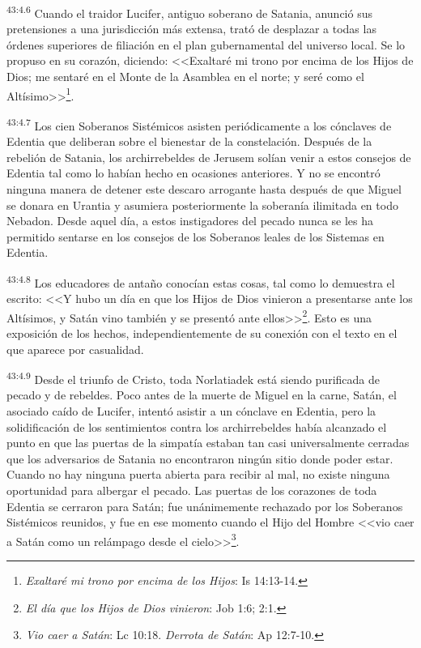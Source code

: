 \par
\textsuperscript{43:4.6} Cuando el traidor Lucifer, antiguo soberano de Satania, anunció sus pretensiones a una jurisdicción más extensa, trató de desplazar a todas las órdenes superiores de filiación en el plan gubernamental del universo local. Se lo propuso en su corazón, diciendo: <<Exaltaré mi trono por encima de los Hijos de Dios; me sentaré en el Monte de la Asamblea en el norte; y seré como el Altísimo>>\footnote{\textit{Exaltaré mi trono por encima de los Hijos}: Is 14:13-14.}.

\par
\textsuperscript{43:4.7} Los cien Soberanos Sistémicos asisten periódicamente a los cónclaves de Edentia que deliberan sobre el bienestar de la constelación. Después de la rebelión de Satania, los archirrebeldes de Jerusem solían venir a estos consejos de Edentia tal como lo habían hecho en ocasiones anteriores. Y no se encontró ninguna manera de detener este descaro arrogante hasta después de que Miguel se donara en Urantia y asumiera posteriormente la soberanía ilimitada en todo Nebadon. Desde aquel día, a estos instigadores del pecado nunca se les ha permitido sentarse en los consejos de los Soberanos leales de los Sistemas en Edentia.

\par
\textsuperscript{43:4.8} Los educadores de antaño conocían estas cosas, tal como lo demuestra el escrito: <<Y hubo un día en que los Hijos de Dios vinieron a presentarse ante los Altísimos, y Satán vino también y se presentó ante ellos>>\footnote{\textit{El día que los Hijos de Dios vinieron}: Job 1:6; 2:1.}. Esto es una exposición de los hechos, independientemente de su conexión con el texto en el que aparece por casualidad.

\par
\textsuperscript{43:4.9} Desde el triunfo de Cristo, toda Norlatiadek está siendo purificada de pecado y de rebeldes. Poco antes de la muerte de Miguel en la carne, Satán, el asociado caído de Lucifer, intentó asistir a un cónclave en Edentia, pero la solidificación de los sentimientos contra los archirrebeldes había alcanzado el punto en que las puertas de la simpatía estaban tan casi universalmente cerradas que los adversarios de Satania no encontraron ningún sitio donde poder estar. Cuando no hay ninguna puerta abierta para recibir al mal, no existe ninguna oportunidad para albergar el pecado. Las puertas de los corazones de toda Edentia se cerraron para Satán; fue unánimemente rechazado por los Soberanos Sistémicos reunidos, y fue en ese momento cuando el Hijo del Hombre <<vio caer a Satán como un relámpago desde el cielo>>\footnote{\textit{Vio caer a Satán}: Lc 10:18. \textit{Derrota de Satán}: Ap 12:7-10.}.


